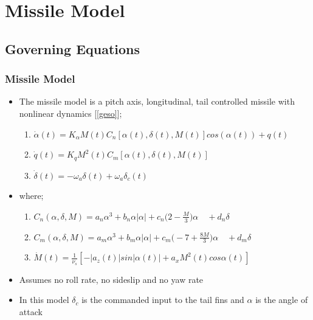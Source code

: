 \documentclass[table,10pt,red]{beamer}	%
\begin{document}
\section{Missile Model} %
\subsection{Governing Equations}
	\begin{frame}
	\frametitle{Missile Model}
	 
 	\begin{itemize}  %
		\item The missile model is a pitch axis,
		longitudinal, tail controlled missile with nonlinear dynamics [\ref{geso}];
		\begin{enumerate}
				\item $\dot{\alpha}(t)=	K_\alpha M(t) C_n [\alpha(t),\delta(t),M(t)]cos(\alpha(t)) + q(t) $
				\item $\dot{q}(t) =	K_q M^2(t) C_m [\alpha(t),\delta(t),M(t)]$\\
				\item $\dot{\delta}(t)	=	-\omega_a\delta(t) + \omega_a\delta_c(t)$
 		\end{enumerate}
		\end{itemize}
	\begin{itemize}
		\item  where;
			\begin{enumerate}
				\item $C_n(\alpha,\delta,M)=a_n\alpha^3+b_n\alpha|\alpha|+c_n\Big(2-\frac{M}{3}\Big)\alpha\quad+ d_n\delta$
				\item $C_m(\alpha,\delta,M)=a_m\alpha^3+b_m\alpha|\alpha|+ c_m\Big(-7+\frac{8M}{3}\Big)\alpha 
				\quad+d_m\delta$
					
				 \item $\dot{M}(t)=\frac{1}{\nu_s}[-|a_z(t)|sin|\alpha(t)|+a_xM^2(t)cos\alpha(t)]$
			\end{enumerate}
	\end{itemize}
	\begin{itemize}
		\item Assumes no roll rate, no sideslip and no yaw rate
		\item In this model $\delta_c$ is the commanded input to the tail fins and $\alpha$ is the angle of attack
\end{itemize}


	\end{frame}
\end{document}
